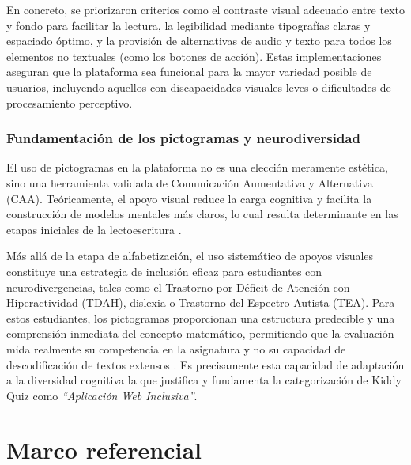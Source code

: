 En concreto, se priorizaron criterios como el contraste visual adecuado
entre texto y fondo para facilitar la lectura, la legibilidad mediante
tipografías claras y espaciado óptimo, y la provisión de alternativas
de audio y texto para todos los elementos no textuales (como los botones
de acción). Estas implementaciones aseguran que la plataforma sea
funcional para la mayor variedad posible de usuarios, incluyendo
aquellos con discapacidades visuales leves o dificultades de
procesamiento perceptivo.

\subsubsection{Fundamentación de los pictogramas y neurodiversidad}

El uso de pictogramas en la plataforma no es una elección meramente
estética, sino una herramienta validada de Comunicación Aumentativa y
Alternativa (CAA). Teóricamente, el apoyo visual reduce la carga
cognitiva y facilita la construcción de modelos mentales más claros,
lo cual resulta determinante en las etapas iniciales de la
lectoescritura \cite{mayer2014multimedia,guillomia2021cognitive}.

Más allá de la etapa de alfabetización, el uso sistemático de apoyos
visuales constituye una estrategia de inclusión eficaz para estudiantes
con neurodivergencias, tales como el Trastorno por Déficit de Atención
con Hiperactividad (TDAH), dislexia o Trastorno del Espectro Autista
(TEA). Para estos estudiantes, los pictogramas proporcionan una
estructura predecible y una comprensión inmediata del concepto
matemático, permitiendo que la evaluación mida realmente su competencia
en la asignatura y no su capacidad de descodificación de textos extensos
\cite{zurita2026arasaac,guillomia2021cognitive}. Es precisamente esta
capacidad de adaptación a la diversidad cognitiva la que justifica y
fundamenta la categorización de Kiddy Quiz como
\textit{``Aplicación Web Inclusiva''}.

\section{Marco referencial}
\label{sec:marco-referencial}

